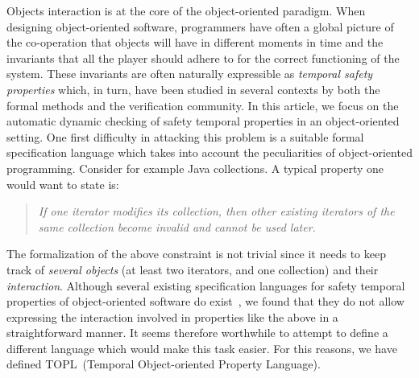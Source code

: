 \documentclass{llncs} %
\newcommand{\TPL}{TOPL}
\begin{document}
Objects interaction is at the core of the object-oriented paradigm. When designing object-oriented software, 
programmers have often  a global picture of the co-operation that objects will have in different moments in time and the 
invariants that all the player should adhere to for the correct functioning of the system.
These invariants are often naturally expressible as {\em temporal safety properties} which, in turn, have been 
studied in several contexts by both the formal methods and the verification community. 
%
In this article, we focus on the automatic dynamic checking of safety temporal properties in an object-oriented setting. 
One first difficulty in attacking this problem is a suitable formal specification language which takes into account the peculiarities of object-oriented programming. Consider for 
example  Java collections. A typical property one would want to state is:
\begin{quote}
{\em If one iterator modifies its collection, then other existing iterators of the same collection become invalid and cannot be used later.}
\end{quote}
\noindent
The formalization of the above constraint is not trivial since it 
needs to keep track of {\em several objects} (at least two iterators, and one collection) and their {\em interaction}.
Although several existing specification languages for safety temporal properties of object-oriented software do exist~\cite{strom1986,dblp:conf/oopsla/bierhoffa07,dblp:conf/oopsla/naeeml08,disney2011,ball2002},
we found that they do not allow expressing the interaction involved in properties like the above in a straightforward manner. 
It seems therefore worthwhile to attempt to define a different language which would make this task easier.  
For this reasons,  we have defined  \TPL\ (Temporal Object-oriented Property Language).
\end{document}
